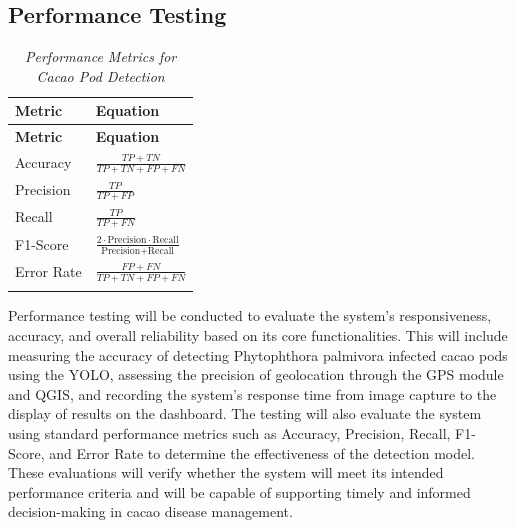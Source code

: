 \subsection*{Performance Testing}

\begin{longtable}{p{4cm} >{\centering\arraybackslash}p{7cm}}
	\caption{\textit{Performance Metrics for Cacao Pod Detection}} \label{tab:metrics}                    \\
	
	\toprule
	\textbf{Metric} & \textbf{Equation}                                                                   \\
	\midrule
	\endfirsthead
	
	\toprule
	\textbf{Metric} & \textbf{Equation}                                                                   \\
	\midrule
	\endhead
	
	\bottomrule
	\endfoot
	
	Accuracy        &
	$\displaystyle \frac{TP + TN}{TP + TN + FP + FN}$                                                     \\ \addlinespace \addlinespace
	
	Precision       &
	$\displaystyle \frac{TP}{TP + FP}$                                                                    \\ \addlinespace \addlinespace
	
	Recall          &
	$\displaystyle \frac{TP}{TP + FN}$                                                                    \\ \addlinespace \addlinespace
	
	F1-Score        &
	$\displaystyle \frac{2 \cdot \text{Precision} \cdot \text{Recall}}{\text{Precision} + \text{Recall}}$ \\ \addlinespace \addlinespace
	
	Error Rate      &
	$\displaystyle \frac{FP + FN}{TP + TN + FP + FN}$                                                     \\ \addlinespace \addlinespace
\end{longtable}

Performance testing will be conducted to evaluate the system’s responsiveness, accuracy, and overall reliability based on its core functionalities. This will include measuring the accuracy of detecting Phytophthora palmivora infected cacao pods using the YOLO, assessing the precision of geolocation through the GPS module and QGIS, and recording the system’s response time from image capture to the display of results on the dashboard. The testing will also evaluate the system using standard performance metrics such as Accuracy, Precision, Recall, F1-Score, and Error Rate to determine the effectiveness of the detection model. These evaluations will verify whether the system will meet its intended performance criteria and will be capable of supporting timely and informed decision-making in cacao disease management.

